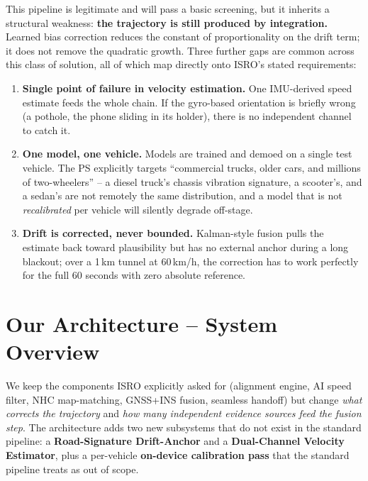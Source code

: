 \documentclass[10.5pt]{article}
\begin{document}
\vspace{-0.2cm}
This pipeline is legitimate and will pass a basic screening, but it inherits a structural weakness: \textbf{the trajectory is still produced by integration.} Learned bias correction reduces the constant of proportionality on the drift term; it does not remove the quadratic growth. Three further gaps are common across this class of solution, all of which map directly onto ISRO's stated requirements:

\begin{enumerate}
\item \textbf{Single point of failure in velocity estimation.} One IMU-derived speed estimate feeds the whole chain. If the gyro-based orientation is briefly wrong (a pothole, the phone sliding in its holder), there is no independent channel to catch it.
\item \textbf{One model, one vehicle.} Models are trained and demoed on a single test vehicle. The PS explicitly targets ``commercial trucks, older cars, and millions of two-wheelers'' -- a diesel truck's chassis vibration signature, a scooter's, and a sedan's are not remotely the same distribution, and a model that is not \emph{recalibrated} per vehicle will silently degrade off-stage.
\item \textbf{Drift is corrected, never bounded.} Kalman-style fusion pulls the estimate back toward plausibility but has no external anchor during a long blackout; over a 1\,km tunnel at 60\,km/h, the correction has to work perfectly for the full 60 seconds with zero absolute reference.
\end{enumerate}

\section{Our Architecture -- System Overview}

We keep the components ISRO explicitly asked for (alignment engine, AI speed filter, NHC map-matching, GNSS+INS fusion, seamless handoff) but change \emph{what corrects the trajectory} and \emph{how many independent evidence sources feed the fusion step}. The architecture adds two new subsystems that do not exist in the standard pipeline: a \textbf{Road-Signature Drift-Anchor} and a \textbf{Dual-Channel Velocity Estimator}, plus a per-vehicle \textbf{on-device calibration pass} that the standard pipeline treats as out of scope.
\end{document}

